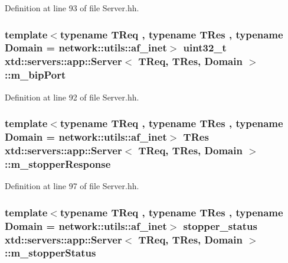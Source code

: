 Definition at line 93 of file Server.\+hh.

\subsubsection[{\texorpdfstring{m\+\_\+bip\+Port}{m_bipPort}}]{\setlength{\rightskip}{0pt plus 5cm}template$<$typename T\+Req , typename T\+Res , typename Domain  = network\+::utils\+::af\+\_\+inet$>$ uint32\+\_\+t {\bf xtd\+::servers\+::app\+::\+Server}$<$ T\+Req, T\+Res, Domain $>$\+::m\+\_\+bip\+Port\hspace{0.3cm}{\ttfamily [protected]}}\hypertarget{classxtd_1_1servers_1_1app_1_1Server_a849adda20d929ad1116564177986e146}{}\label{classxtd_1_1servers_1_1app_1_1Server_a849adda20d929ad1116564177986e146}


Definition at line 92 of file Server.\+hh.

\subsubsection[{\texorpdfstring{m\+\_\+stopper\+Response}{m_stopperResponse}}]{\setlength{\rightskip}{0pt plus 5cm}template$<$typename T\+Req , typename T\+Res , typename Domain  = network\+::utils\+::af\+\_\+inet$>$ T\+Res {\bf xtd\+::servers\+::app\+::\+Server}$<$ T\+Req, T\+Res, Domain $>$\+::m\+\_\+stopper\+Response\hspace{0.3cm}{\ttfamily [protected]}}\hypertarget{classxtd_1_1servers_1_1app_1_1Server_afb80e8da001aafc8ffbf5b2dd8a9213e}{}\label{classxtd_1_1servers_1_1app_1_1Server_afb80e8da001aafc8ffbf5b2dd8a9213e}


Definition at line 97 of file Server.\+hh.

\subsubsection[{\texorpdfstring{m\+\_\+stopper\+Status}{m_stopperStatus}}]{\setlength{\rightskip}{0pt plus 5cm}template$<$typename T\+Req , typename T\+Res , typename Domain  = network\+::utils\+::af\+\_\+inet$>$ stopper\+\_\+status {\bf xtd\+::servers\+::app\+::\+Server}$<$ T\+Req, T\+Res, Domain $>$\+::m\+\_\+stopper\+Status\hspace{0.3cm}{\ttfamily [protected]}}\hypertarget{classxtd_1_1servers_1_1app_1_1Server_ae5180a630e0f23596a0909f845d00e69}{}\label{classxtd_1_1servers_1_1app_1_1Server_ae5180a630e0f23596a0909f845d00e69}


